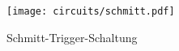 \begin{figure}[H]
  \begin{center}
    \texttt{[image: circuits/schmitt.pdf]}
  \end{center}
  \caption{Schmitt-Trigger-Schaltung}
\end{figure}